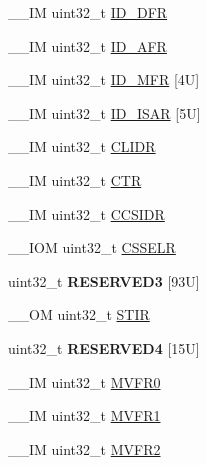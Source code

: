 \begin{DoxyCompactItemize}
\+\_\+\+\_\+\+IM uint32\+\_\+t \mbox{\hyperlink{struct_s_c_b___type_a883f7e28417c51d3a3bf03185baf448f}{I\+D\+\_\+\+D\+FR}}
\item 
\+\_\+\+\_\+\+IM uint32\+\_\+t \mbox{\hyperlink{struct_s_c_b___type_a70c88751f9ace03b5ca3e364c65b9617}{I\+D\+\_\+\+A\+FR}}
\item 
\+\_\+\+\_\+\+IM uint32\+\_\+t \mbox{\hyperlink{struct_s_c_b___type_a1df83089e7726e2723e2c4f370814832}{I\+D\+\_\+\+M\+FR}} \mbox{[}4\+U\mbox{]}
\item 
\+\_\+\+\_\+\+IM uint32\+\_\+t \mbox{\hyperlink{struct_s_c_b___type_a966bd8b1d3dd6ab85b5db9b435f6fc1f}{I\+D\+\_\+\+I\+S\+AR}} \mbox{[}5\+U\mbox{]}
\item 
\+\_\+\+\_\+\+IM uint32\+\_\+t \mbox{\hyperlink{struct_s_c_b___type_a40b4dc749a25d1c95c2125e88683a591}{C\+L\+I\+DR}}
\item 
\+\_\+\+\_\+\+IM uint32\+\_\+t \mbox{\hyperlink{struct_s_c_b___type_aad937861e203bb05ae22c4369c458561}{C\+TR}}
\item 
\+\_\+\+\_\+\+IM uint32\+\_\+t \mbox{\hyperlink{struct_s_c_b___type_a90c793639fc9470e50e4f4fc4b3464da}{C\+C\+S\+I\+DR}}
\item 
\+\_\+\+\_\+\+I\+OM uint32\+\_\+t \mbox{\hyperlink{struct_s_c_b___type_ae627674bc3ccfc2d67caccfc1f4ea4ed}{C\+S\+S\+E\+LR}}
\item 
\mbox{\label{struct_s_c_b___type_ad114787ec2c930bcdabf3f5668d93954}} 
uint32\+\_\+t {\bfseries R\+E\+S\+E\+R\+V\+E\+D3} \mbox{[}93\+U\mbox{]}
\item 
\+\_\+\+\_\+\+OM uint32\+\_\+t \mbox{\hyperlink{struct_s_c_b___type_ada9cbba14ab1cc3fddd585f870932db8}{S\+T\+IR}}
\item 
\mbox{\label{struct_s_c_b___type_af348cb636c453ec2e83974c0b38fe9d7}} 
uint32\+\_\+t {\bfseries R\+E\+S\+E\+R\+V\+E\+D4} \mbox{[}15\+U\mbox{]}
\item 
\+\_\+\+\_\+\+IM uint32\+\_\+t \mbox{\hyperlink{struct_s_c_b___type_a9b0103b438c8922eaea5624f71afbbc8}{M\+V\+F\+R0}}
\item 
\+\_\+\+\_\+\+IM uint32\+\_\+t \mbox{\hyperlink{struct_s_c_b___type_a0a610dc4212de3ce1ad62e9afa76c728}{M\+V\+F\+R1}}
\item 
\+\_\+\+\_\+\+IM uint32\+\_\+t \mbox{\hyperlink{struct_s_c_b___type_a8353348c9336aa1aadcbf86b6f0f18c9}{M\+V\+F\+R2}}
\item 
\mbox{\label{struct_s_c_b___type_a942b5bad37ebf529ebb15a33522ae475}} 

\end{DoxyCompactItemize}
